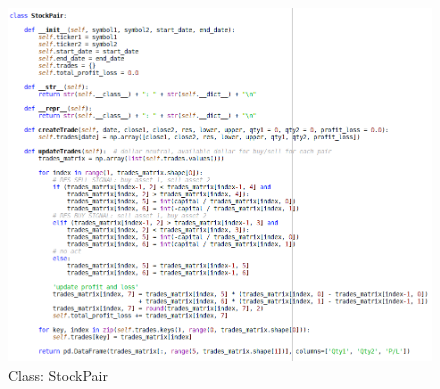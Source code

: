 \begin{figure}[h!]
\centering
\includegraphics[scale=0.8]{model/images/class.png}
\caption{Class: StockPair}
\label{fig:class}
\end{figure}

